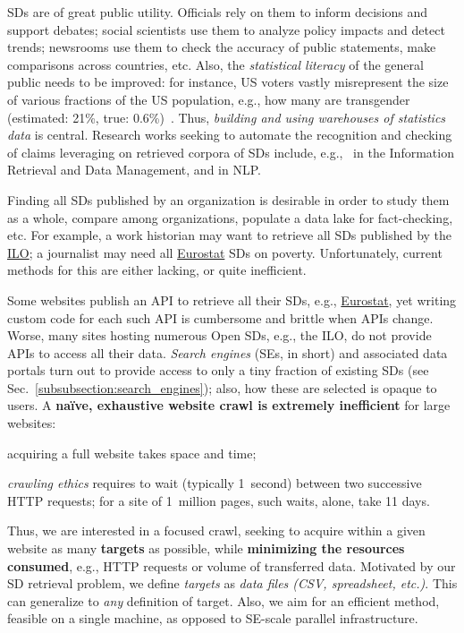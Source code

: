 SDs are of great public utility. Officials rely on them to
inform decisions and support debates; social scientists use them to
analyze policy impacts and detect trends; newsrooms use them to check the
accuracy of public statements, make comparisons across countries, etc.
Also, the \emph{statistical literacy} of the general public needs to be improved: for instance, US voters vastly misrepresent the size of various fractions of
the US population, e.g., how many are transgender (estimated: 21\%,
true: 0.6\%)~\cite{wrongstats}. Thus, \emph{building and using warehouses of
statistics data} is central. Research works seeking to automate the recognition and checking of claims leveraging on retrieved corpora of SDs include, e.g.,~\cite{DBLP:journals/pvldb/Karagiannis0PT20,DBLP:journals/debu/0002P21,DBLP:conf/webdb/CaoMT18,balalau2024star, claimbuster} in the Information Retrieval and Data Management, and \cite{vlachos-riedel-2015-identification} in NLP.

Finding all SDs published by an organization is desirable in
order to study them as a whole, compare among organizations, populate a data lake for fact-checking, etc. For example, a work historian may want to retrieve all SDs published by the \href{https://www.ilo.org}{ILO}; a journalist may need all \href{https://ec.europa.eu/eurostat/}{Eurostat} SDs on poverty.  Unfortunately, current methods for this are either lacking, or quite inefficient.

Some websites publish an API to retrieve all their SDs, e.g.,
\href{https://ec.europa.eu/eurostat/}{Eurostat},
yet writing
custom code for each such API is cumbersome and brittle when APIs change.
Worse, many sites hosting numerous Open SDs, e.g., the ILO, do not
provide APIs to access all their data.
\emph{Search engines} (SEs, in short) and associated data
portals turn out to provide access to only a tiny fraction of
existing SDs (see Sec.~\ref{subsubsection:search_engines}); also, how these are selected is opaque to users.
A  \textbf{na\"ive, exhaustive website crawl is extremely inefficient} for large websites:
\begin{inparaenum}[(i)]
	\item acquiring a full
	website takes space and time;
	\item {\em crawling ethics} requires to wait
	(typically 1~second) between two successive HTTP requests; for
	a site of 1~million pages, such waits, alone, take 11
	days.
\end{inparaenum}
Thus, we are interested in a focused crawl, seeking to acquire within a given website as many \textbf{targets} as possible, while
\textbf{minimizing the resources consumed}, e.g., HTTP requests or
volume of transferred data.
Motivated by our SD retrieval problem, we define \emph{targets} as \emph{data files (CSV, spreadsheet, etc.)}. This can generalize to \emph{any} definition of target. Also, we aim for an efficient method, feasible on a single machine, as opposed to SE-scale parallel infrastructure.

